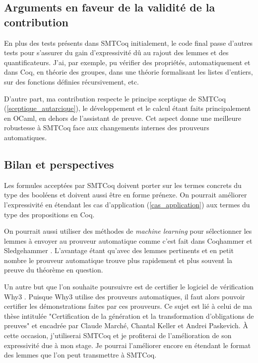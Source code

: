 \documentclass[11pt]{article}
\begin{document}
\subsection{Arguments en faveur de la validité de la contribution}

En plus des tests présents dans SMTCoq initialement, le code final passe d'autres tests pour s'assurer du gain d'expressivité dû au rajout des lemmes et des quantificateurs. J'ai, par exemple, pu vérifier des propriétés, automatiquement et dans Coq, en théorie des groupes, dans une théorie formalisant les listes d'entiers, sur des fonctions définies récursivement, etc.

D'autre part, ma contribution respecte le principe sceptique de SMTCoq (\ref{sceptique_autarcique}), le développement et le calcul étant faits principalement en OCaml, en dehors de l'assistant de preuve. Cet aspect donne une meilleure robustesse à SMTCoq face aux changements internes des prouveurs automatiques.


\subsection{Bilan et perspectives}\label{persp}

Les formules acceptées par SMTCoq doivent porter sur les termes concrets du type des booléens et doivent aussi être en forme prénexe. On pourrait améliorer l'expressivité en étendant les cas d'application (\ref{cas_application}) aux termes du type des propositions en Coq.

On pourrait aussi utiliser des méthodes de \textit{machine learning} pour sélectionner les lemmes à envoyer au prouveur automatique comme c'est fait dans Coqhammer et Sledgehammer \cite{hol_selector, coqhammer}. L'avantage étant qu'avec des lemmes pertinents et en petit nombre le prouveur automatique trouve plus rapidement et plus souvent la preuve du théorème en question.

Un autre but que l'on souhaite poursuivre est de certifier le logiciel de vérification Why3 \cite{why3_intro}. Puisque Why3 utilise des prouveurs automatiques, il faut alors pouvoir certifier les démonstrations faites par ces prouveurs. Ce sujet est lié à celui de ma thèse intitulée "Certification de la génération et la transformation d'obligations de preuves" et encadrée par Claude Marché, Chantal Keller et Andrei Paskevich. À cette occasion, j'utiliserai SMTCoq et je profiterai de l'amélioration de son expressivité due à mon stage. Je pourrai l'améliorer encore en étendant le format des lemmes que l'on peut transmettre à SMTCoq. \medbreak
\end{document}

